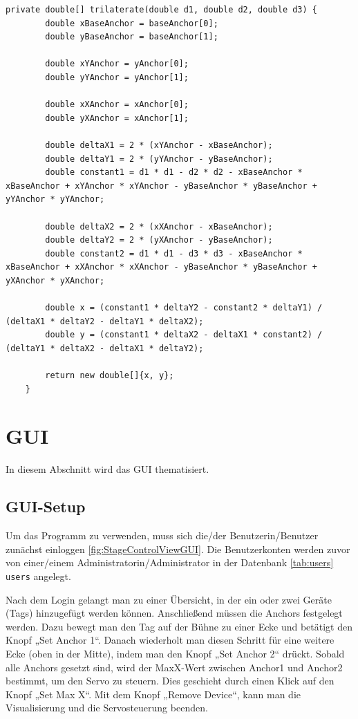 \newpage
\begin{lstlisting}[style=Java, caption=Trilateration in Java, captionpos=b]
	private double[] trilaterate(double d1, double d2, double d3) {
		double xBaseAnchor = baseAnchor[0];
		double yBaseAnchor = baseAnchor[1];
		
		double xYAnchor = yAnchor[0];
		double yYAnchor = yAnchor[1];
		
		double xXAnchor = xAnchor[0];
		double yXAnchor = xAnchor[1];
		
		double deltaX1 = 2 * (xYAnchor - xBaseAnchor);
		double deltaY1 = 2 * (yYAnchor - yBaseAnchor);
		double constant1 = d1 * d1 - d2 * d2 - xBaseAnchor * xBaseAnchor + xYAnchor * xYAnchor - yBaseAnchor * yBaseAnchor + yYAnchor * yYAnchor;
		
		double deltaX2 = 2 * (xXAnchor - xBaseAnchor);
		double deltaY2 = 2 * (yXAnchor - yBaseAnchor);
		double constant2 = d1 * d1 - d3 * d3 - xBaseAnchor * xBaseAnchor + xXAnchor * xXAnchor - yBaseAnchor * yBaseAnchor + yXAnchor * yXAnchor;
		
		double x = (constant1 * deltaY2 - constant2 * deltaY1) / (deltaX1 * deltaY2 - deltaY1 * deltaX2);
		double y = (constant1 * deltaX2 - deltaX1 * constant2) / (deltaY1 * deltaX2 - deltaX1 * deltaY2);
		
		return new double[]{x, y};
	}
\end{lstlisting}

\newpage
\section{GUI}
In diesem Abschnitt wird das GUI thematisiert.

\subsection{GUI-Setup}
Um das Programm zu verwenden, muss sich die/der Benutzerin/Benutzer zunächst einloggen \ref{fig:StageControlViewGUI}. Die Benutzerkonten werden zuvor von einer/einem Administratorin/Administrator in der Datenbank \ref{tab:users} \texttt{users} angelegt.  

Nach dem Login gelangt man zu einer Übersicht, in der ein oder zwei Geräte (Tags) hinzugefügt werden können. Anschließend müssen die Anchors festgelegt werden. Dazu bewegt man den Tag auf der Bühne zu einer Ecke und betätigt den Knopf „Set Anchor 1“. Danach wiederholt man diesen Schritt für eine weitere Ecke (oben in der Mitte), indem man den Knopf „Set Anchor 2“ drückt. Sobald alle Anchors gesetzt sind, wird der MaxX-Wert zwischen Anchor1 und Anchor2 bestimmt, um den Servo zu steuern. Dies geschieht durch einen Klick auf den Knopf „Set Max X“. Mit dem Knopf „Remove Device“, kann man die Visualisierung und die Servosteuerung beenden.   

